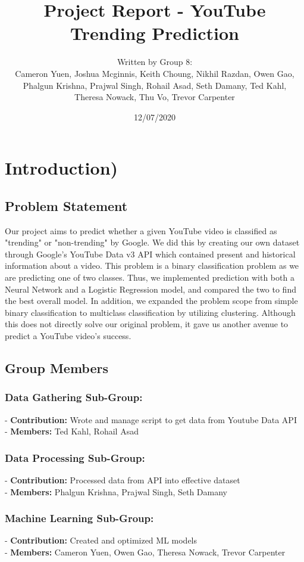 \documentclass{article}
\title{Project Report - YouTube Trending Prediction}
\date{12/07/2020}
\author{Written by Group 8: \\ 
Cameron Yuen, Joshua Mcginnis, Keith Choung, Nikhil Razdan, Owen Gao, \\ 
Phalgun Krishna, Prajwal Singh, Rohail Asad, Seth Damany, Ted Kahl, \\ 
Theresa Nowack, Thu Vo, Trevor Carpenter}
\begin{document}
\maketitle

\section*{Introduction)}
\subsection*{Problem Statement}
\quad Our project aims to predict whether a given YouTube video is classified as "trending" or "non-trending" by Google. We did this by creating our own dataset through Google's YouTube Data v3 API which contained present and historical information about a video. This problem is a binary classification problem as we are predicting one of two classes. Thus, we implemented prediction with both a Neural Network and a Logistic Regression model, and compared the two to find the best overall model. In addition, we expanded the problem scope from simple binary classification to multiclass classification by utilizing clustering. Although this does not directly solve our original problem, it gave us another avenue to predict a YouTube video's success.

\subsection*{Group Members}
\subsubsection*{Data Gathering Sub-Group:}
- \textbf{Contribution:} Wrote and manage script to get data from Youtube Data API \\
- \textbf{Members:} Ted Kahl, Rohail Asad
\subsubsection*{Data Processing Sub-Group:}
- \textbf{Contribution:} Processed data from API into effective dataset \\
- \textbf{Members:} Phalgun Krishna, Prajwal Singh, Seth Damany
\subsubsection*{Machine Learning Sub-Group:}
- \textbf{Contribution:} Created and optimized ML models \\
- \textbf{Members:} Cameron Yuen, Owen Gao, Theresa Nowack, Trevor Carpenter
\end{document}
